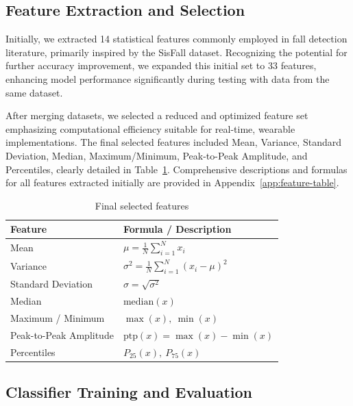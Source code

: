 \documentclass[conference]{IEEEtran}
\begin{document}
\subsection{Feature Extraction and Selection}

Initially, we extracted 14 statistical features commonly employed in fall detection literature, primarily inspired by the SisFall dataset. Recognizing the potential for further accuracy improvement, we expanded this initial set to 33 features, enhancing model performance significantly during testing with data from the same dataset.
\vspace{1em}

After merging datasets, we selected a reduced and optimized feature set emphasizing computational efficiency suitable for real-time, wearable implementations. The final selected features included Mean, Variance, Standard Deviation, Median, Maximum/Minimum, Peak-to-Peak Amplitude, and Percentiles, clearly detailed in Table~\ref{tab:final-selected-features}. Comprehensive descriptions and formulas for all features extracted initially are provided in Appendix~\ref{app:feature-table}.

\begin{table}[htbp]
\centering
\caption{Final selected features}
\label{tab:final-selected-features}
\renewcommand{\arraystretch}{1.3}
\small
\begin{tabular}{|l|l|}
\hline
\textbf{Feature} & \textbf{Formula / Description} \\
\hline
Mean & $\mu = \frac{1}{N} \sum_{i=1}^{N} x_i$ \\
\hline
Variance & $\sigma^2 = \frac{1}{N} \sum_{i=1}^{N} (x_i - \mu)^2$ \\
\hline
Standard Deviation & $\sigma = \sqrt{\sigma^2}$ \\
\hline
Median & $\text{median}(x)$ \\
\hline
Maximum / Minimum & $\max(x),\ \min(x)$ \\
\hline
Peak-to-Peak Amplitude & $\text{ptp}(x) = \max(x) - \min(x)$ \\
\hline
Percentiles & $P_{25}(x),\ P_{75}(x)$ \\
\hline
\end{tabular}
\end{table}

\subsection{Classifier Training and Evaluation}
\end{document}
